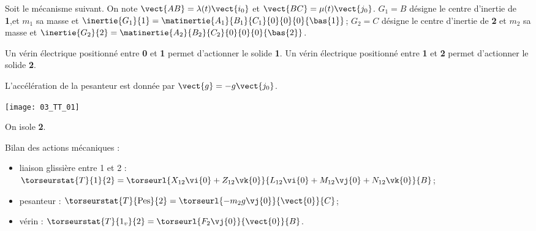 \normaltrue
\correctiontrue



\setcounter{question}{0}%
\ifcorrection
\else
{}
\fi

\ifprof
\else
Soit le mécanisme suivant. On note $\vect{AB}=\lambda(t)\vect{i_0}$ et $\vect{BC}=\mu(t)\vect{j_0}$.
$G_1 = B$ désigne le centre d'inertie de \textbf{1},et $m_1$ sa masse et $\inertie{G_1}{1}=\matinertie{A_1}{B_1}{C_1}{0}{0}{0}{\bas{1}}$; 
$G_2 = C$ désigne le centre d'inertie de \textbf{2} et  $m_2$ sa masse  et $\inertie{G_2}{2}=\matinertie{A_2}{B_2}{C_2}{0}{0}{0}{\bas{2}}$.

 Un vérin électrique positionné entre \textbf{0} et \textbf{1} permet d'actionner le solide \textbf{1}.
 Un vérin électrique positionné entre \textbf{1} et \textbf{2} permet d'actionner le solide \textbf{2}.

L'accélération de la pesanteur est donnée par $\vect{g}=-g\vect{j_0}$.

\begin{marginfigure}
\texttt{[image: 03\_TT\_01]}
\end{marginfigure}
\fi

\ifprof

On isole \textbf{2}. 

\vspace{.25cm}

Bilan des actions mécaniques : 
\begin{itemize}
\item liaison glissière entre 1 et 2 : 
$\torseurstat{T}{1}{2}= \torseurl{X_{12}\vi{0}+Z_{12}\vk{0}}{L_{12}\vi{0}+M_{12}\vj{0}+N_{12}\vk{0}}{B}$;
\item pesanteur : $\torseurstat{T}{\text{Pes}}{2}= \torseurl{-m_2 g \vj{0}}{\vect{0}}{C}$;
\item vérin : $\torseurstat{T}{1_v}{2}= \torseurl{F_2 \vj{0}}{\vect{0}}{B}$.
\end{itemize}

\vspace{.25cm}

